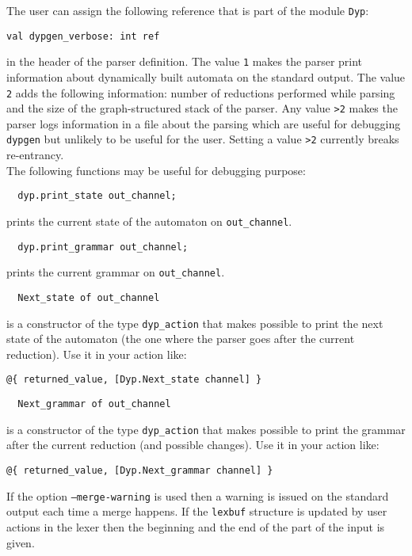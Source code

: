 \documentclass[12pt]{article}
\begin{document}
{The user can assign the following reference that is part of the module \verb|Dyp|:
\begin{verbatim}
val dypgen_verbose: int ref
\end{verbatim}
in the header of the parser definition. The value \texttt{1} makes the parser print information about dynamically built automata on the standard output. The value \texttt{2} adds the following information: number of reductions performed while parsing and the size of the graph-structured stack of the parser. Any value \texttt{>2} makes the parser logs information in a file about the parsing which are useful for debugging \texttt{dypgen} but unlikely to be useful for the user. Setting a value \verb|>2| currently breaks re-entrancy.\\

The following functions may be useful for debugging purpose:
\begin{verbatim}
  dyp.print_state out_channel;
\end{verbatim}
prints the current state of the automaton on \verb|out_channel|.

\begin{verbatim}
  dyp.print_grammar out_channel;
\end{verbatim}
prints the current grammar on \verb|out_channel|.

\begin{verbatim}
  Next_state of out_channel
\end{verbatim}
is a constructor of the type \verb|dyp_action| that makes possible to print the next state of the automaton (the one where the parser goes after the current reduction). Use it in your action like:
\begin{verbatim}
@{ returned_value, [Dyp.Next_state channel] }
\end{verbatim}

\begin{verbatim}
  Next_grammar of out_channel
\end{verbatim}
is a constructor of the type \verb|dyp_action| that makes possible to print the grammar after the current reduction (and possible changes). Use it in your action like:
\begin{verbatim}
@{ returned_value, [Dyp.Next_grammar channel] }
\end{verbatim}

If the option \texttt{--merge-warning} is used then a warning is issued on the standard output each time a merge happens. If the \texttt{lexbuf} structure is updated by user actions in the lexer then the beginning and the end of the part of the input is given.

}
\end{document}

